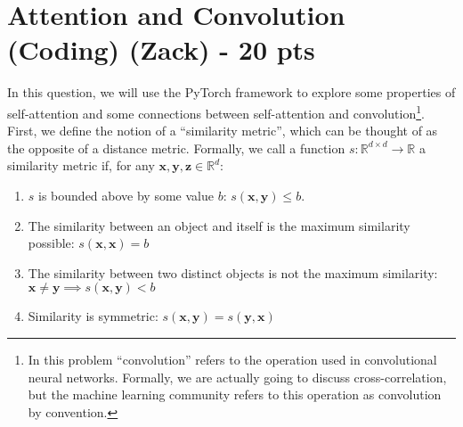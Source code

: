 \documentclass{exam}
\begin{document}
\section{Attention and Convolution (Coding) (Zack) - 20 pts}
In this question, we will use the PyTorch framework to explore some properties of self-attention and some connections between self-attention and convolution\footnote{In this problem ``convolution'' refers to the operation used in convolutional neural networks. Formally, we are actually going to discuss cross-correlation, but the machine learning community refers to this operation as convolution by convention.}. First, we define the notion of a ``similarity metric'', which can be thought of as the opposite of a distance metric. Formally, we call a function $s: \mathbb{R}^{d \times d} \to \mathbb{R}$ a similarity metric if, for any $\mathbf{x}, \mathbf{y}, \mathbf{z} \in \mathbb{R}^d$:
\begin{enumerate}
    \item $s$ is bounded above by some value $b$: $s(\mathbf{x}, \mathbf{y}) \leq b$.
    \item The similarity between an object and itself is the maximum similarity possible: $s(\mathbf{x}, \mathbf{x}) = b$
    \item The similarity between two distinct objects is not the maximum similarity: $\mathbf{x} \neq \mathbf{y} \implies s(\mathbf{x}, \mathbf{y}) < b$
    \item Similarity is symmetric: $s(\mathbf{x}, \mathbf{y}) = s(\mathbf{y}, \mathbf{x})$
\end{enumerate}
\end{document}
